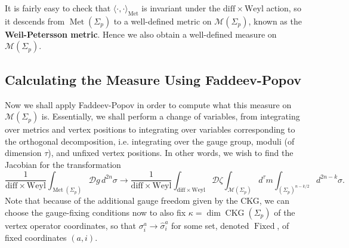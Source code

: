 \documentclass{report}
\theoremstyle{plain}
\theoremstyle{definition}
\theoremstyle{remark}
\newcommand{\cD}{\mathcal{D}}
\newcommand{\cM}{\mathcal{M}}
\newcommand{\diff}{\mathrm{diff}}
\newcommand{\Weyl}{\mathrm{Weyl}}
\DeclareMathOperator{\Met}{Met}
\DeclareMathOperator{\CKG}{CKG}
\DeclareMathOperator{\Fixed}{Fixed}
\begin{document}
It is fairly easy to check that $\langle \cdot, \cdot \rangle_{\Met}$
is invariant under the $\diff \times \Weyl$ action, so it descends
from $\Met(\Sigma_p)$ to a well-defined metric on $\cM(\Sigma_p)$,
known as the {\bf Weil-Petersson metric}. Hence we also obtain a
well-defined measure on $\cM(\Sigma_p)$.

\subsection{Calculating the Measure Using Faddeev-Popov}

Now we shall apply Faddeev-Popov in order to compute what this measure
on $\cM(\Sigma_p)$ is. Essentially, we shall perform a change of
variables, from integrating over metrics and vertex positions to
integrating over variables corresponding to the orthogonal
decomposition, i.e. integrating over the gauge group, moduli (of
dimension $\tau$), and unfixed vertex positions. In other words, we
wish to find the Jacobian for the transformation
\[ \frac{1}{\diff \times \Weyl}\int_{\Met(\Sigma_p)} \cD g \, d^{2n}\sigma \to \frac{1}{\diff \times \Weyl}\int_{\diff \times \Weyl} \cD \zeta \int_{\cM(\Sigma_p)} d^\tau m \int_{(\Sigma_p)^{n-k/2}} d^{2n-k}\sigma. \]
Note that because of the additional gauge freedom given by the CKG, we
can choose the gauge-fixing conditions now to also fix $\kappa = \dim
\CKG(\Sigma_p)$ of the vertex operator coordinates, so that
$\sigma_i^a \to \hat{\sigma}_i^a$ for some set, denoted $\Fixed$, of
fixed coordinates $(a, i)$.
\end{document}
